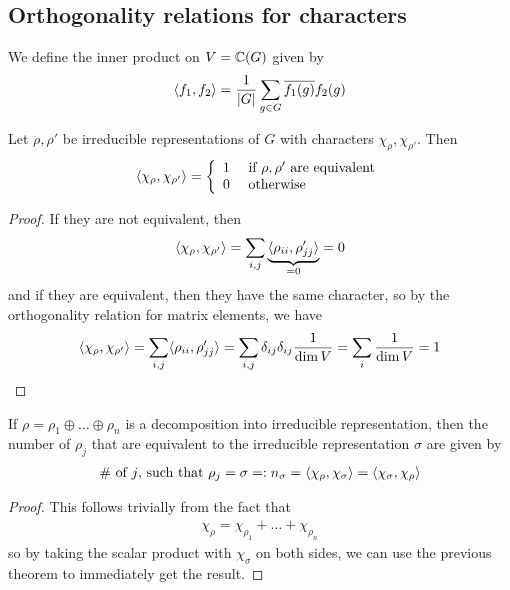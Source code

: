 \subsection{Orthogonality relations for characters}
We define the inner product on $V = \mathbb{C}(G)$ given by
\begin{align*}
  \langle f_1,f_2\rangle = \frac{1}{\vert G\vert} \sum_{g \in G}\overline{f_1(g)}f_2(g)
\end{align*}
\begin{thm}[]
Let $\rho,\rho'$ be irreducible representations of $G$ with characters $\chi_{\rho}, \chi_{\rho'}$. Then
\begin{align*}
  \langle\chi_{\rho},\chi_{\rho'}\rangle = \left\{\begin{array}{ll}
    1 & \text{ if $\rho, \rho'$ are equivalent}\\
    0 & \text{ otherwise}
  \end{array} \right.
\end{align*}
\end{thm}
\begin{proof}
If they are not equivalent, then
\begin{align*}
  \langle\chi_{\rho},\chi_{\rho'}\rangle = \sum_{i,j}
  \underbrace{\langle\rho_{ii},\rho_{jj}'\rangle}_{=0} = 0
\end{align*}
and if they are equivalent, then they have the same character, so by the orthogonality relation for matrix elements, we have
\begin{align*}
  \langle\chi_{\rho},\chi_{\rho'}\rangle = \sum_{i,j} \langle\rho_{ii},\rho_{jj}'\rangle = \sum_{i,j}\delta_{ij}\delta_{ij} \frac{1}{\dim V} = \sum_{i}\frac{1}{\dim V} = 1
\end{align*}
\end{proof}
\begin{cor}[]
If $\rho = \rho_1 \oplus \ldots \oplus \rho_n$ is a decomposition into irreducible representation, then the number of $\rho_j$ that are equivalent to the irreducible representation $\sigma$ are given by
\begin{align*}
  \# \text{ of $j$, such that $\rho_j = \sigma$} =: n_{\sigma} = \langle\chi_{\rho},\chi_{\sigma}\rangle = \langle\chi_{\sigma},\chi_{\rho}\rangle
\end{align*}
\end{cor}
\begin{proof}
This follows trivially from the fact that
\begin{align*}
  \chi_{\rho} = \chi_{\rho_1} + \ldots + \chi_{\rho_n}
\end{align*}
so by taking the scalar product with $\chi_{\sigma}$ on both sides,  we can use the previous theorem to immediately get the result.
\end{proof}

